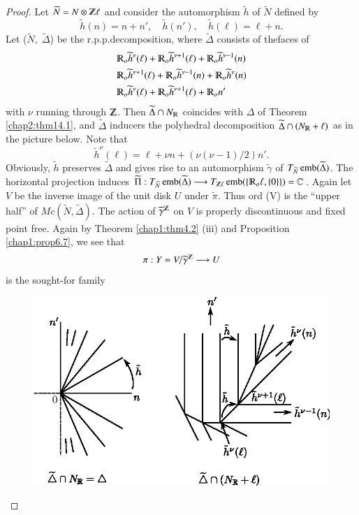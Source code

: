 \begin{proof}
 Let $\widetilde{N}= N \otimes \varmathbb{Z} \ell$ and consider 
 the automorphism $\widetilde{h}$ of $\widetilde{N} $ defined by 
 $$
 \widetilde{h}(n) =n + n', \quad  \widetilde{h}(n'), \quad
 \widetilde{h}(\ell)  = \ell +n .  
$$
  Let ($\widetilde{N}, \; \widetilde{\Delta}$) be the 
  r.p.p.decomposition, where $\widetilde{\Delta}$ consists of
  the\pageoriginale   faces of   
  \begin{align*}
 & \varmathbb{R}_o\widetilde {h} ^ \nu(\ell) +   \varmathbb{R}_o\widetilde
    {h} ^ {\nu+1}(\ell) +\varmathbb{R}_o\widetilde {h}^{\nu-1}(n)\\ 
    &\varmathbb{R}_o\widetilde {h} ^ {\nu +1}(\ell) +
    \varmathbb{R}_o\widetilde {h} ^ {\nu -1}(n) +
    \varmathbb{R}_o\widetilde {h} ^ \nu(n)\\ 
      &\varmathbb{R}_o\widetilde {h} ^ \nu(\ell) +
    \varmathbb{R}_o\widetilde {h} ^ {\nu +1} (\ell ) +
    \varmathbb{R}_on' 
 \end{align*}
 with  $\nu$ running through $\varmathbb{Z}$. Then $
 \widetilde{\Delta} \cap N_{\varmathbb{R}}$ coincides with $\Delta$
 of  Theorem \ref{chap2:thm14.1},  and $\widetilde{\Delta}$ inducers the
 polyhedral  decomposition $\widetilde{\Delta} \cap (N_{\varmathbb{R}}
 + \ell )$  as  in the picture below. Note that   
 $$
 \widetilde{h}^\nu(\ell) =\ell + \nu n + ( \nu (\nu -1) /2 ) n'.
 $$
 Obviously, $\widetilde{h}$ preserves $\widetilde{\Delta}$ and gives
 rise to an automorphism $\widetilde{\gamma}$ of $
 T_{\widetilde{N}}\break\emb (\widetilde{\Delta})$. The horizontal
 projection induces $\widetilde{\Pi}: T_{\widetilde{N}}\emb
 (\widetilde{\Delta}) \longrightarrow T_{\varmathbb{Z}\ell}\break \emb (\{
 \varmathbb{R}_o \ell , \{0\}\})= \mathbb{C}$. Again let $V$ be
 the inverse image of the unit disk $U$  under $\widetilde{\pi}$. Thus
 ord (V) is the ``upper half'' of
 $Mc(\widetilde{N},\widetilde{\Delta})$. The action of 
 $\widetilde{\gamma}^{\varmathbb{Z}}$ on $V$   is properly
 discontinuous and fixed point free. Again by Theorem
 \ref{chap1:thm4.2} (iii) and  Proposition \ref{chap1:prop6.7}, we see that  
  $$
 \pi : Y = V/\widetilde{\gamma}^{\varmathbb{Z}} \longrightarrow U 
 $$
  is the sought-for family
\begin{figure}[H]
\centering 
\includegraphics{vol58-fig/fig58-78.eps} 

\end{figure}
\end{proof}
